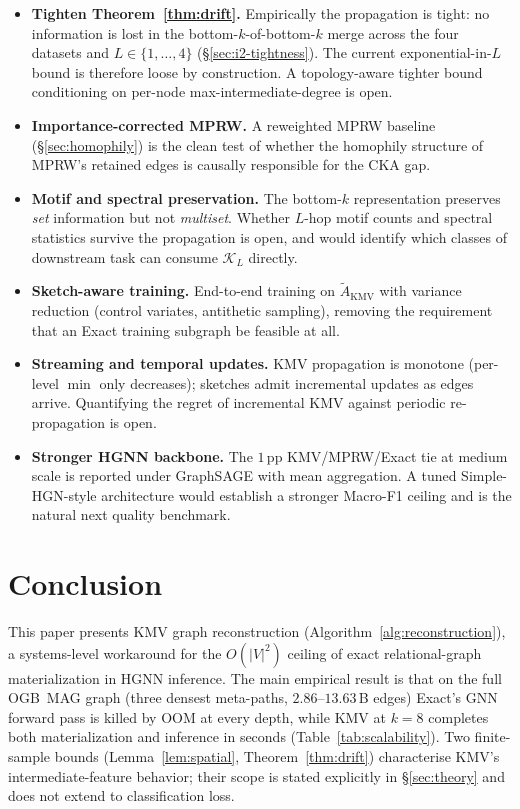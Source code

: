 \documentclass[sigconf]{acmart}
\begin{document}
\begin{itemize}
\item \textbf{Tighten Theorem~\ref{thm:drift}.} Empirically the propagation is tight: no information is lost in the bottom-$k$-of-bottom-$k$ merge across the four datasets and $L\in\{1,\ldots,4\}$ (\S\ref{sec:i2-tightness}). The current exponential-in-$L$ bound is therefore loose by construction. A topology-aware tighter bound conditioning on per-node max-intermediate-degree is open.
\item \textbf{Importance-corrected MPRW.} A reweighted MPRW baseline (\S\ref{sec:homophily}) is the clean test of whether the homophily structure of MPRW's retained edges is causally responsible for the CKA gap.
\item \textbf{Motif and spectral preservation.} The bottom-$k$ representation preserves \emph{set} information but not \emph{multiset}. Whether $L$-hop motif counts and spectral statistics survive the propagation is open, and would identify which classes of downstream task can consume $\mathcal{K}_L$ directly.
\item \textbf{Sketch-aware training.} End-to-end training on $\widetilde{A}_\text{KMV}$ with variance reduction (control variates, antithetic sampling), removing the requirement that an Exact training subgraph be feasible at all.
\item \textbf{Streaming and temporal updates.} KMV propagation is monotone (per-level $\min$ only decreases); sketches admit incremental updates as edges arrive. Quantifying the regret of incremental KMV against periodic re-propagation is open.
\item \textbf{Stronger HGNN backbone.} The $1$\,pp KMV/MPRW/Exact tie at medium scale is reported under GraphSAGE with mean aggregation. A tuned Simple-HGN-style architecture would establish a stronger Macro-F1 ceiling and is the natural next quality benchmark.
\end{itemize}

\section{Conclusion}
\label{sec:conclusion}

This paper presents KMV graph reconstruction (Algorithm~\ref{alg:reconstruction}), a systems-level workaround for the $O(|V|^2)$ ceiling of exact relational-graph materialization in HGNN inference.
The main empirical result is that on the full OGB~MAG graph (three densest meta-paths, $2.86$--$13.63$\,B edges) Exact's GNN forward pass is killed by OOM at every depth, while KMV at $k{=}8$ completes both materialization and inference in seconds (Table~\ref{tab:scalability}).
Two finite-sample bounds (Lemma~\ref{lem:spatial}, Theorem~\ref{thm:drift}) characterise KMV's intermediate-feature behavior; their scope is stated explicitly in \S\ref{sec:theory} and does not extend to classification loss.
\end{document}
